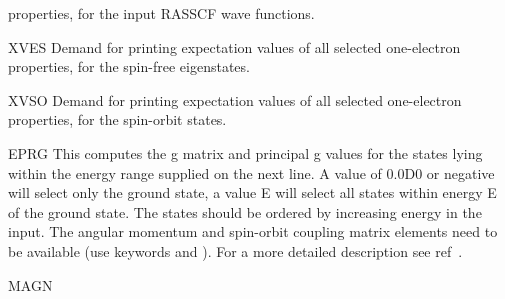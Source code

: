 \begin{keywordlist}
properties, for the input RASSCF wave functions.
\item[XVES]
Demand for printing expectation values of all selected one-electron
properties, for the spin-free eigenstates.
\item[XVSO]
Demand for printing expectation values of all selected one-electron
properties, for the spin-orbit states.
\item[EPRG]
This computes the g matrix and principal g values for the
states lying within the energy range supplied on the next line.
A value of 0.0D0 or negative will select only the ground state,
a value E will select all states within energy E of the ground state.
The states should be ordered by increasing energy in the input.
The angular momentum and spin-orbit coupling matrix elements
need to be available (use keywords  and ).
For a more detailed description see ref~\cite{EPRG:2008}.
\item[MAGN]

\end{keywordlist}
